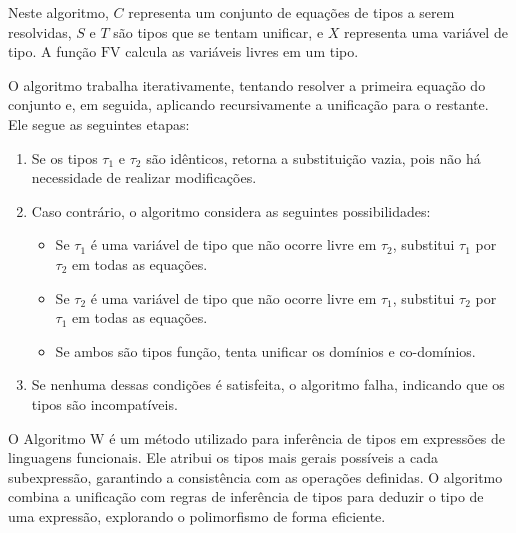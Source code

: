 Neste algoritmo, $C$ representa um conjunto de equações de tipos a serem resolvidas, $S$ e $T$ são tipos que se tentam unificar, e $X$ representa uma variável de tipo.
A função $\text{FV}$ calcula as variáveis livres em um tipo.

O algoritmo trabalha iterativamente, tentando resolver a primeira equação do conjunto e, em seguida, aplicando recursivamente a unificação para o restante.
Ele segue as seguintes etapas:

\begin{enumerate}
  \item Se os tipos $\tau_1$ e $\tau_2$ são idênticos, retorna a substituição vazia, pois não há necessidade de realizar modificações. 
  \item Caso contrário, o algoritmo considera as seguintes possibilidades:
    \begin{itemize}
      \item Se $\tau_1$ é uma variável de tipo que não ocorre livre em $\tau_2$, substitui $\tau_1$ por $\tau_2$ em todas as equações.
      \item Se $\tau_2$ é uma variável de tipo que não ocorre livre em $\tau_1$, substitui $\tau_2$ por $\tau_1$ em todas as equações.
      \item Se ambos são tipos função, tenta unificar os domínios e co-domínios.
    \end{itemize}
  \item Se nenhuma dessas condições é satisfeita, o algoritmo falha, indicando que os tipos são incompatíveis.
\end{enumerate}

O Algoritmo W é um método utilizado para inferência de tipos em expressões de linguagens funcionais.
Ele atribui os tipos mais gerais possíveis a cada subexpressão, garantindo a consistência com as operações definidas.
O algoritmo combina a unificação com regras de inferência de tipos para deduzir o tipo de uma expressão, explorando o polimorfismo de forma eficiente.

